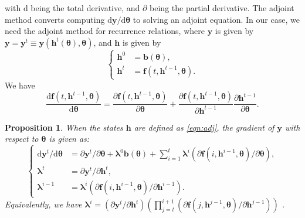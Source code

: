 \documentclass{article}
\newtheorem{proposition}{{\bf Proposition}}
\newcommand{\diff}{\mathrm{d}}
\newcommand{\blambda}{\boldsymbol{\lambda}}
\newcommand{\bphi}{\boldsymbol{\phi}}
\newcommand{\ka}[1]{{\color{brown} Kavosh: #1 }}
\begin{document}
with $\diff$ being the total derivative, and $\partial$ being the partial derivative. The adjoint method converts computing $\diff \mathbf{y}/\diff \boldsymbol{\theta}$ to solving an adjoint equation. In our case, we need the adjoint method for recurrence relations, where $\mathbf{y}$ is given by $\mathbf{y}=\mathbf{y}^t\equiv \mathbf{y}(\mathbf{h}^t(\boldsymbol{\theta}),\boldsymbol{\theta})$, and $\mathbf{h}$ is given by
\begin{equation}
\label{eqn:adj}
\begin{cases}
    \mathbf{h}^0 &= \mathbf{b}(\boldsymbol{\theta}),\\
    \mathbf{h}^t &= \mathbf{f}(t,\mathbf{h}^{t-1},\boldsymbol{\theta}).
\end{cases}
\end{equation}
We have 
\begin{equation}
    \frac{\diff \mathbf{f}(t,\mathbf{h}^{t-1},\boldsymbol{\theta})}{\diff \boldsymbol{\theta}} = \frac{\partial \mathbf{f}(t,\mathbf{h}^{t-1},\boldsymbol{\theta})}{\partial \boldsymbol{\theta}} + \frac{\partial \mathbf{f}(t,\mathbf{h}^{t-1},\boldsymbol{\theta})}{\partial \mathbf{h}^{t-1}}\frac{\partial \mathbf{h}^{t-1}}{\partial \boldsymbol{\theta}}.
\end{equation}
\begin{proposition}{\citep{CAO2002171}}
\label{prop:adjoint}
    When the states $\mathbf{h}$ are defined as \autoref{eqn:adj}, the gradient of $\mathbf{y}$ with respect to $\boldsymbol{\theta}$ is given as:
    \begin{equation}
    \begin{cases}
        \diff \mathbf{y}^t / \diff \boldsymbol{\theta} &= \partial \mathbf{y}^t/\partial \boldsymbol{\theta}+\blambda^0\mathbf{b}(\boldsymbol{\theta})+\sum_{i=1}^t\blambda^i\left(\partial \mathbf{f}(i,\mathbf{h}^{i-1},\boldsymbol{\theta})/\partial \boldsymbol{\theta}\right),\\%
        \blambda^t &= \partial \mathbf{y}^t/\partial \mathbf{h}^t,\\
        \blambda^{i-1} &= \blambda^i\left(\partial \mathbf{f}(i,\mathbf{h}^{i-1},\boldsymbol{\theta})/ \partial \mathbf{h}^{i-1}\right).%
    \end{cases}
    \end{equation}
    Equivalently, we have $\blambda^i=(\partial \mathbf{y}^t/\partial \mathbf{h}^t)\left(\prod_{j=t}^{i+1}\left(\partial \mathbf{f}(j,\mathbf{h}^{j-1},\boldsymbol{\theta})/ \partial \mathbf{h}^{j-1}\right)\right)$ \citep{adjointjohnson2007}.
\end{proposition}
\end{document}
